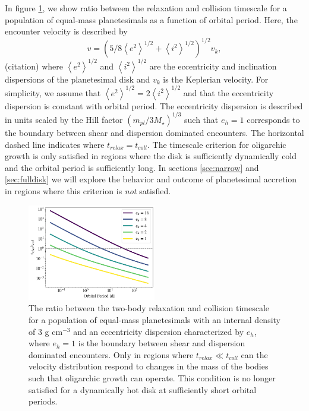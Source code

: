 \documentclass[twocolumn]{aastex63}
\begin{document}
In figure \ref{fig:timescales}, we show ratio between the relaxation
and collision timescale for a population of equal-mass planetesimals
as a function of orbital period. Here, the encounter velocity is
described by
$$
v = \left( 5/8 \left< e^2 \right>^{1/2} + \left< i^2 \right>^{1/2}
\right)^{1/2} v_{k},
$$
(citation) where $\left< e^2 \right>^{1/2}$ and $\left< i^2
\right>^{1/2}$ are the eccentricity and inclination dispersions of the
planetesimal disk and $v_{k}$ is the Keplerian velocity. For
simplicity, we assume that $\left< e^2 \right>^{1/2} = 2\left< i^2
\right>^{1/2}$ \citep{ida93a} and that the eccentricity dispersion is
constant with orbital period. The eccentricity dispersion is described
in units scaled by the Hill factor $\left( m_{pl}/ 3 M_{\star}
\right)^{1/3}$ such that $e_{h} = 1$ corresponds to the boundary
between shear and dispersion dominated encounters. The horizontal
dashed line indicates where $t_{relax} = t_{coll}$. The timescale
criterion for oligarchic growth is only satisfied in regions where the
disk is sufficiently dynamically cold and the orbital period is
sufficiently long. In sections \ref{sec:narrow} and \ref{sec:fulldisk}
we will explore the behavior and outcome of planetesimal accretion in regions where this criterion is \textit{not} satisfied. 

\begin{figure}
\begin{center}
    \includegraphics[width=0.5\textwidth]{figures/timescales.png}
    \caption{The ratio between the two-body relaxation and collision
      timescale for a population of equal-mass planetesimals with an
      internal density of 3 g cm$^{-3}$ and an eccentricity dispersion
      characterized by $e_h$, where $e_h = 1$ is the boundary between
      shear and dispersion dominated encounters. Only in regions where $t_{relax} \ll t_{coll}$ can the velocity distribution respond to changes in the mass of the bodies such that oligarchic growth can operate. This condition is no longer satisfied for a dynamically hot disk at sufficiently short orbital periods.\label{fig:timescales}}
\end{center}
\end{figure}
\end{document}
